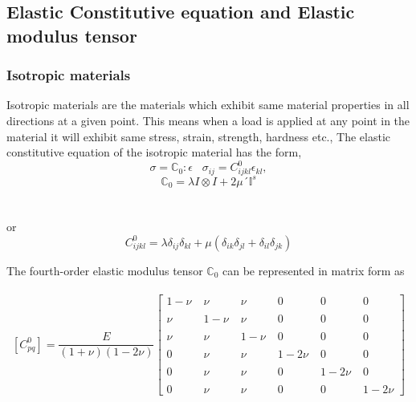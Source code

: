 \documentclass[a4paper,14pt]{extarticle}
\begin{document}
\subsection{Elastic Constitutive equation and Elastic modulus tensor}
\subsubsection{Isotropic materials}
\indent\indent\indent Isotropic materials are the materials which exhibit same material properties in all directions at a given point. This means when a load is applied at any point in the material it will exhibit same stress, strain, strength, hardness etc., The elastic constitutive equation of the isotropic material has the form, 
\begin{equation}
  \sigma = \mathbb{C}_{0} : \epsilon   \;\;\;  \sigma_{ij}  =  C^{0}_{ijkl}\epsilon_{kl},
\end{equation}
\begin{equation}
\mathbb{C}_{0} =  \lambda I \otimes I  +  2\mu ´\mathbb{I}^{s}
\end{equation}\\
\\
or
\begin{equation}
C^{0}_{ijkl} = \lambda\delta_{ij}\delta_{kl}  +  \mu(\delta_{ik}\delta_{jl}+\delta_{il}\delta_{jk})
\end{equation}

The fourth-order elastic modulus tensor $\mathbb{C}_{0}$ can be represented in matrix form as 
\\
\\
$$
[C^{0}_{pq}] =  \frac{E}{(1 + \nu)(1 - 2\nu)}
 \begin{bmatrix}
  1 - \nu \; & \nu \;& \nu\; & 0 \;& 0 \;& 0 \\
  \\
  \nu \; & 1-\nu \;& \nu \;& 0 \;& 0 \;& 0 \\
  \\
  \nu \;& \nu \;& 1-\nu \;& 0 \;& 0 \;& 0 \\
  \\
  0 \;& \nu \;& \nu \;& 1 - 2\nu \;& 0 \;& 0 \\
  \\
  0 \;& \nu \;& \nu \;& 0 \;& 1 - 2\nu\;& 0 \\
  \\
  0\;& \nu \;& \nu \;& 0 \;& 0 \;&1 - 2\nu  
 \end{bmatrix}
 $$
 \\
 \\
\end{document}
